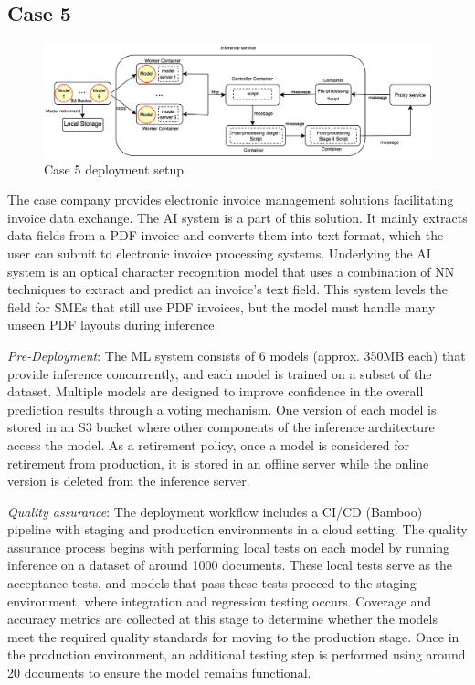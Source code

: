 \subsection*{Case 5} %
\label{case: 5} 
\begin{figure}[b]
\centering
\includegraphics[width=\linewidth]{images/case5_deployment_process.png}
\caption{Case 5 deployment setup}
\label{fig: case5_deployment_process}
\end{figure}


The case company provides electronic invoice management solutions facilitating invoice data exchange. The AI system is a part of this solution. It mainly extracts data fields from a PDF invoice and converts them into text format, which the user can submit to electronic invoice processing systems. Underlying the AI system is an optical character recognition model that uses a combination of NN techniques to extract and predict an invoice’s text field. This system levels the field for SMEs that still use PDF invoices, but the model must handle many unseen PDF layouts during inference.


\textit{Pre-Deployment}: The ML system consists of 6 models (approx. 350MB each) that provide inference concurrently, and each model is trained on a subset of the dataset. Multiple models are designed to improve confidence in the overall prediction results through a voting mechanism. One version of each model is stored in an S3 bucket where other components of the inference architecture access the model. As a retirement policy, once a model is considered for retirement from production, it is stored in an offline server while the online version is deleted from the inference server.

\textit{Quality assurance}: The deployment workflow includes a CI/CD (Bamboo) pipeline with staging and production environments in a cloud setting. The quality assurance process begins with performing local tests on each model by running inference on a dataset of around 1000 documents. These local tests serve as the acceptance tests, and models that pass these tests proceed to the staging environment, where integration and regression testing occurs. Coverage and accuracy metrics are collected at this stage to determine whether the models meet the required quality standards for moving to the production stage. Once in the production environment, an additional testing step is performed using around 20 documents to ensure the model remains functional.

